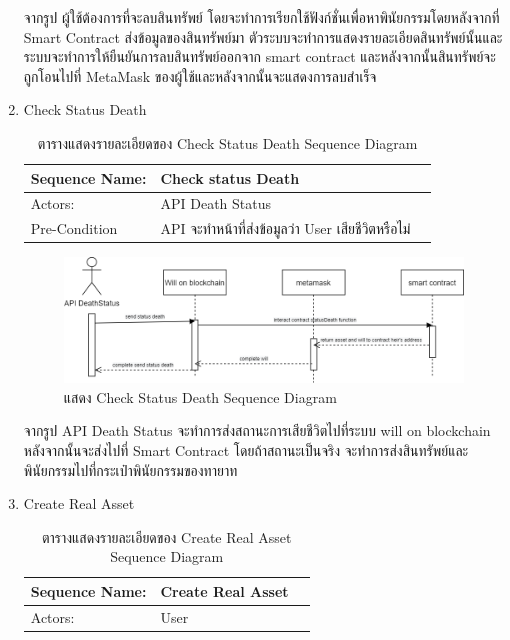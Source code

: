 \documentclass[12pt,oneside,openright,a4paper]{cpe-thai-project}
\begin{document}
\begin{enumerate}[label=\thesubsection.\arabic*,leftmargin=0pt,itemindent=1.25cm]
\begin{figure}[!thb]
		\end{figure}
		\FloatBarrier
	\tab จากรูป ผู้ใช้ต้องการที่จะลบสินทรัพย์ โดยจะทำการเรียกใช้ฟังก์ชั่นเพื่อหาพินัยกรรมโดยหลังจากที่ Smart Contract ส่งข้อมูลของสินทรัพย์มา ตัวระบบจะทำการแสดงรายละเอียดสินทรัพย์นั้นและระบบจะทำการให้ยืนยันการลบสินทรัพย์ออกจาก smart contract และหลังจากนั้นสินทรัพย์จะถูกโอนไปที่ MetaMask ของผู้ใช้และหลังจากนั้นจะแสดงการลบสำเร็จ
\clearpage
	\item Check Status Death
\begin{table}[h]
\centering
\caption{ตารางแสดงรายละเอียดของ Check Status Death Sequence Diagram}
\begin{tabularx}{\textwidth}{|l|X|X|} 
\hline
Sequence Name: & Check status Death                                 \\ 
\hline
Actors:        & API Death Status                                   \\ 
\hline
Pre-Condition  & API จะทำหน้าที่ส่งข้อมูลว่า User เสียชีวิตหรือไม่  \\
\hline
\end{tabularx}
\end{table}
		\begin{figure}[!thb]
			\centering
			\includegraphics[scale=0.45]{checkStatusDeathseq}
			\caption{แสดง Check Status Death Sequence Diagram}
		\end{figure}
		\FloatBarrier
	\tab จากรูป API Death Status จะทำการส่งสถานะการเสียชีวิตไปที่ระบบ will on blockchain หลังจากนั้นจะส่งไปที่ Smart Contract โดยถ้าสถานะเป็นจริง จะทำการส่งสินทรัพย์และพินัยกรรมไปที่กระเป๋าพินัยกรรมของทายาท
\clearpage
	\item Create Real Asset
	\begin{table}[h]
\centering
\caption{ตารางแสดงรายละเอียดของ Create Real Asset Sequence Diagram}
\begin{tabularx}{\textwidth}{|l|X|X|} 
\hline
Sequence Name: & Create Real Asset                                                     \\ 
\hline
Actors:        & User                                                                  \\ 

\end{tabularx}
\end{table}
\end{enumerate}
\end{document}
